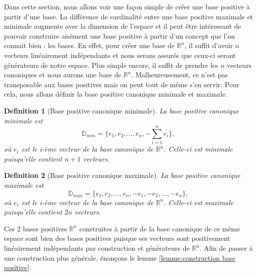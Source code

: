 \documentclass[french]{report}
\newtheorem{defn}{Definition}[section]
\newcommand{\definition}[2]{\begin{defn}[#1] #2 \end{defn}}
\newcommand{\D}{\mathbb{D}}
\begin{document}
Dans cette section, nous allons voir une façon simple de créer une base positive à partir d'une base. La différence de cardinalité entre une base positive maximale et minimale augmente avec la dimension de l'espace et il peut être intéressant de pouvoir construire aisément une base positive à partir d'un concept que l'on connait bien : les bases. En effet, pour créer une base de $\mathbb{R}^n$, il suffit d'avoir $n$ vecteurs linéairement indépendants et nous serons assurés que ceux-ci seront générateurs de notre espace. Plus simple encore, il suffit de prendre les $n$ vecteurs canoniques et nous aurons une base de $\mathbb{R}^n$. Malheureusement, ce n'est pas transposable aux bases positives mais on peut tout de même s'en servir.
Pour cela, nous allons définir la base positive canonique minimale et maximale.

\definition{Base positive canonique minimale}
{
    La base positive canonique minimale est
    $$\D_{min} = \{ e_1,e_2,\dots,e_n,-\sum_{i=1}^n e_i \},$$
    où $e_i$ est le i-ème vecteur de la base canonique de $\mathbb{R}^n$. Celle-ci est minimale puisqu'elle contient $n+1$ vecteurs.
}


\definition{Base positive canonique maximale}
{
    La base positive canonique maximale est
    $$\D_{max} = \{ e_1,e_2,\dots,e_n,-e_1,-e_2,\dots,-e_n \},$$
    où $e_i$ est le i-ème vecteur de la base canonique de $\mathbb{R}^n$. Celle-ci est maximale puisqu'elle contient $2n$ vecteurs.
}

Ces 2 bases positives $\mathbb{R}^n$ construites à partir de la base canonique de ce même espace sont bien des bases positives puisque ses vecteurs sont positivement linéairement indépendants par construction et générateurs de $\mathbb{R}^n$.
Afin de passer à une construction plus générale, énonçons le lemme \ref{lemme:construction base positive}.
\end{document}
